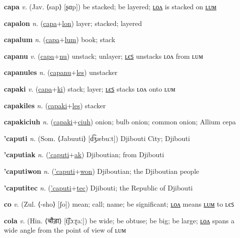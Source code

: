 \textbf{\hypertarget{capa}{capa}} \textit{v.} (Jav. ⟨sap⟩ [ʂɑp])
be stacked; be layered; \hyperlink{capalon}{ʟᴏᴧ} is stacked on \hyperlink{capalum}{ʟᴜᴍ}

\textbf{\hypertarget{capalon}{capalon}} \textit{n.} (\hyperlink{capa}{capa}+\allowbreak \hyperlink{lon}{lon})
layer; stacked; layered

\textbf{\hypertarget{capalum}{capalum}} \textit{n.} (\hyperlink{capa}{capa}+\allowbreak \hyperlink{lum}{lum})
book; stack

\textbf{\hypertarget{capanu}{capanu}} \textit{v.} (\hyperlink{capa}{capa}+\allowbreak \hyperlink{nu}{nu})
unstack; unlayer; \hyperlink{capanules}{ʟєꜱ} unstacks ʟᴏᴧ from ʟᴜᴍ

\textbf{\hypertarget{capanules}{capanules}} \textit{n.} (\hyperlink{capanu}{capanu}+\allowbreak \hyperlink{les}{les})
unstacker

\textbf{\hypertarget{capaki}{capaki}} \textit{v.} (\hyperlink{capa}{capa}+\allowbreak \hyperlink{ki}{ki})
stack; layer; \hyperlink{capakiles}{ʟєꜱ} stacks ʟᴏᴧ onto ʟᴜᴍ

\textbf{\hypertarget{capakiles}{capakiles}} \textit{n.} (\hyperlink{capaki}{capaki}+\allowbreak \hyperlink{les}{les})
stacker

\textbf{\hypertarget{capakiciuh}{capakiciuh}} \textit{n.} (\hyperlink{capaki}{capaki}+\allowbreak \hyperlink{ciuh}{ciuh})
onion; bulb onion; common onion; Allium cepa

\textbf{\hypertarget{'caputi}{'caputi}} \textit{n.} (Som. ⟨Jabuuti⟩ [d͡ʒæbuːt])
Djibouti City; Djibouti

\textbf{\hypertarget{'caputiak}{'caputiak}} \textit{n.} (\hyperlink{'caputi}{'caputi}+\allowbreak \hyperlink{ak}{ak})
Djiboutian; from Djibouti

\textbf{\hypertarget{'caputiwon}{'caputiwon}} \textit{n.} (\hyperlink{'caputi}{'caputi}+\allowbreak \hyperlink{won}{won})
Djiboutian; the Djiboutian people

\textbf{\hypertarget{'caputitec}{'caputitec}} \textit{n.} (\hyperlink{'caputi}{'caputi}+\allowbreak \hyperlink{tec}{tec})
Djibouti; the Republic of Djibouti

\textbf{\hypertarget{co}{co}} \textit{v.} (Zul. ⟨-sho⟩ [ʃo])
mean; call; name; be significant; \hyperlink{colon}{ʟᴏᴧ} means \hyperlink{colum}{ʟᴜᴍ} to ʟєꜱ

\textbf{\hypertarget{cola}{cola}} \textit{v.} (Hin. ⟨{\devanagari{}चौड़ा}⟩ [t͡ʃɔːɽaː])
be wide; be obtuse; be big; be large; \hyperlink{colalon}{ʟᴏᴧ} spans a wide angle from the point of view of ʟᴜᴍ


